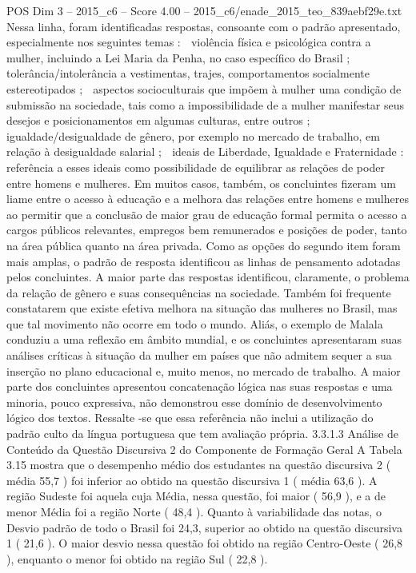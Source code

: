 \begin{textsample}{POS Dim 3 – 2015\_c6 – Score 4.00 – 2015\_c6/enade\_2015\_teo\_839aebf29e.txt}
Nessa linha, foram identificadas respostas, consoante com o padrão apresentado, especialmente nos seguintes temas :  violência física e psicológica contra a mulher, incluindo a Lei Maria da Penha, no caso específico do Brasil ;  tolerância/intolerância a vestimentas, trajes, comportamentos socialmente estereotipados ;  aspectos socioculturais que impõem à mulher uma condição de submissão na sociedade, tais como a impossibilidade de a mulher manifestar seus desejos e posicionamentos em algumas culturas, entre outros ;  igualdade/desigualdade de gênero, por exemplo no mercado de trabalho, em relação à desigualdade salarial ;  ideais de Liberdade, Igualdade e Fraternidade : referência a esses ideais como possibilidade de equilibrar as relações de poder entre homens e mulheres.
Em muitos casos, também, os concluintes fizeram um liame entre o acesso à educação e a melhora das relações entre homens e mulheres ao permitir que a conclusão de maior grau de educação formal permita o acesso a cargos públicos relevantes, empregos bem remunerados e posições de poder, tanto na área pública quanto na área privada.
Como as opções do segundo item foram mais amplas, o padrão de resposta identificou as linhas de pensamento adotadas pelos concluintes.
A maior parte das respostas identificou, claramente, o problema da relação de gênero e suas consequências na sociedade.
Também foi frequente constatarem que existe efetiva melhora na situação das mulheres no Brasil, mas que tal movimento não ocorre em todo o mundo.
Aliás, o exemplo de Malala conduziu a uma reflexão em âmbito mundial, e os concluintes apresentaram suas análises críticas à situação da mulher em países que não admitem sequer a sua inserção no plano educacional e, muito menos, no mercado de trabalho.
A maior parte dos concluintes apresentou concatenação lógica nas suas respostas e uma minoria, pouco expressiva, não demonstrou esse domínio de desenvolvimento lógico dos textos.
Ressalte -se que essa referência não inclui a utilização do padrão culto da língua portuguesa que tem avaliação própria. 3.3.1.3 Análise de Conteúdo da Questão Discursiva 2 do Componente de Formação Geral A Tabela 3.15 mostra que o desempenho médio dos estudantes na questão discursiva 2 ( média 55,7 ) foi inferior ao obtido na questão discursiva 1 ( média 63,6 ).
A região Sudeste foi aquela cuja Média, nessa questão, foi maior ( 56,9 ), e a de menor Média foi a região Norte ( 48,4 ).
Quanto à variabilidade das notas, o Desvio padrão de todo o Brasil foi 24,3, superior ao obtido na questão discursiva 1 ( 21,6 ).
O maior desvio nessa questão foi obtido na região Centro-Oeste ( 26,8 ), enquanto o menor foi obtido na região Sul ( 22,8 ).

\end{textsample}
